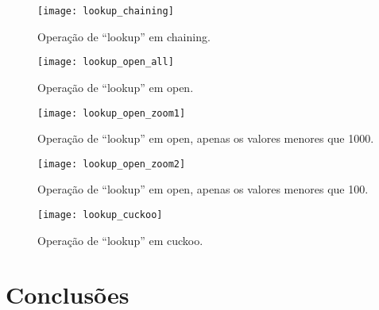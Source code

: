 \documentclass{article}
\begin{document}
\begin{figure}
  \centering
  \texttt{[image: lookup\_chaining]}
  \caption{Operação de ``lookup'' em chaining.}
  \label{fig:lookup_chaining}
\end{figure}

\begin{figure}
  \centering
  \texttt{[image: lookup\_open\_all]}
  \caption{Operação de ``lookup'' em open.}
  \label{fig:lookup_open}
\end{figure}

\begin{figure}
  \centering
  \texttt{[image: lookup\_open\_zoom1]}
  \caption{Operação de ``lookup'' em open, apenas os valores menores que 1000.}
  \label{fig:lookup_open_zoom1}
\end{figure}

\begin{figure}
  \centering
  \texttt{[image: lookup\_open\_zoom2]}
  \caption{Operação de ``lookup'' em open, apenas os valores menores que 100.}
  \label{fig:lookup_open_zoom2}
\end{figure}

\begin{figure}
  \centering
  \texttt{[image: lookup\_cuckoo]}
  \caption{Operação de ``lookup'' em cuckoo.}
  \label{fig:lookup_cuckoo}
\end{figure}

\section{Conclusões}
\end{document}
